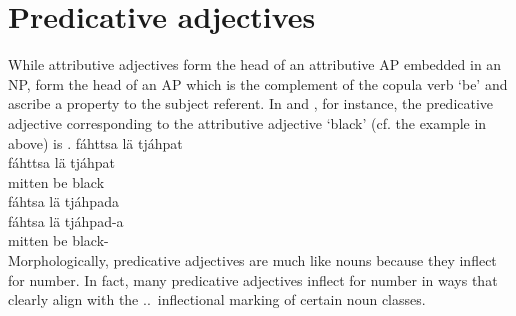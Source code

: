 \section{Predicative adjectives}\label{predADJ}%
While attributive adjectives form the head of an attributive AP embedded in an NP,  form the head of an AP which is the complement of the copula verb  ‘be’ and ascribe a property to the subject referent. %
In  and , for instance, the predicative adjective corresponding to the attributive adjective  ‘black’ (cf. the example in  above) is . %
\ea\label{adjPredEx1}
\glll	fáhttsa lä tjáhpat\\
	fáhttsa lä tjáhpat\\
	mitten\BS{} be\BS{} black\BS{}\\\nopagebreak
{}	
\z
\ea\label{adjPredEx2}
\glll	fáhtsa lä tjáhpada\\
	fáhtsa lä tjáhpad-a\\
	mitten\BS{} be\BS{} black-\\\nopagebreak
{}	
\z
Morphologically, predicative adjectives are much like nouns because they inflect for number. In fact, many predicative adjectives inflect for number in ways that clearly align with the \NOMs.\SGs\TILDE\NOMs.\PLs\ inflectional marking of certain noun classes. 
